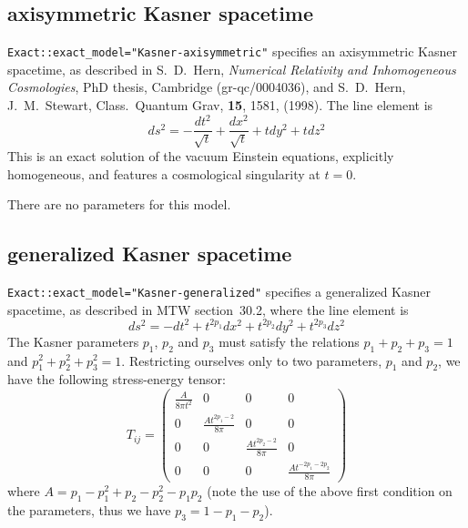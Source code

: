 
\subsection{axisymmetric Kasner spacetime}

\verb|Exact::exact_model="Kasner-axisymmetric"| specifies an
axisymmetric Kasner spacetime, as described in
S.~D.~Hern, {\it Numerical Relativity and Inhomogeneous  Cosmologies\/},
PhD thesis, Cambridge (gr-qc/0004036), and 
S.~D.~Hern, J.~M.~Stewart, Class.\ Quantum Grav, {\bf 15}, 1581, (1998).
The line element is
\begin{equation}
ds^2 = -\frac{dt^2}{\sqrt{t}} + \frac{dx^2}{\sqrt{t}} + t dy^2
+ t dz^2
\end{equation}
This is an exact solution of the vacuum Einstein equations, explicitly
homogeneous, and features a cosmological singularity at $t=0$.

There are no parameters for this model.


\subsection{generalized Kasner spacetime}
\verb|Exact::exact_model="Kasner-generalized"| specifies a
generalized Kasner spacetime, as described in MTW section~30.2,
where the line element is
\begin{equation}
ds^2 = -dt^2 +t^{2p_1}dx^2 + t^{2p_2}dy^2 + t^{2p_3}dz^2
\end{equation}
The Kasner parameters $p_1$, $p_2$ and $p_3$ must satisfy the relations
$p_1+p_2+p_3 = 1$ and
$p_1^2+p_2^2+p_3^2 = 1$.
Restricting ourselves only to two parameters, $p_1$ and $p_2$,
we have the following stress-energy tensor:
\begin{equation}
T_{ij} = \left(
	 \begin{array}{cccc}
	 \frac{A}{8\pi t^2} & 0 & 0 & 0\\
	 0 & \frac{A t^{2p_1-2}}{8 \pi} & 0 & 0\\
	 0 & 0 & \frac{A t^{2p_2-2}}{8\pi} & 0 \\
	 0 & 0 & 0 & \frac{A t^{-2p_1-2p_2}}{8 \pi}%
	 \end{array}
	 \right)
\end{equation}
where $A = p_1 - p_1^2 +p_2 - p_2^2 - p_1 p_2$ (note the use of the above
first condition on the parameters, thus we have $p_3 = 1-p_1-p_2$).  

